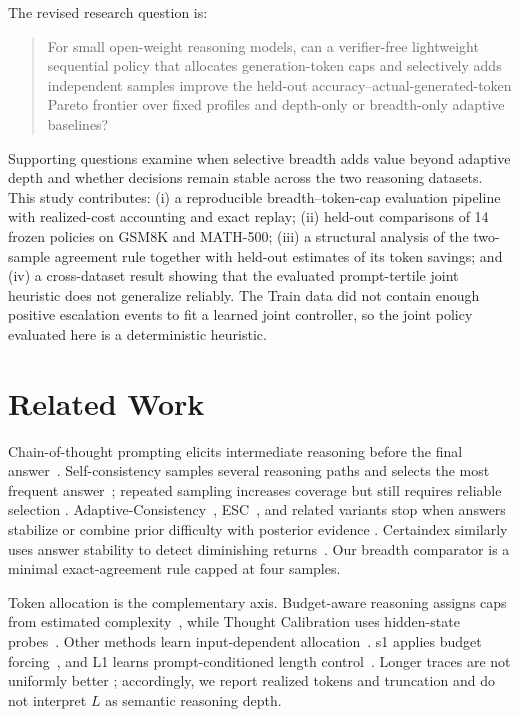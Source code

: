 \documentclass[runningheads]{llncs}
\begin{document}
The revised research question is:

\begin{quote}
For small open-weight reasoning models, can a verifier-free lightweight
sequential policy that allocates generation-token caps and selectively adds
independent samples improve the held-out accuracy--actual-generated-token
Pareto frontier over fixed profiles and depth-only or breadth-only adaptive
baselines?
\end{quote}

Supporting questions examine when selective breadth adds value beyond adaptive
depth and whether decisions remain stable across the two reasoning datasets.
This study contributes: (i) a reproducible
breadth--token-cap evaluation pipeline with realized-cost accounting and exact
replay; (ii) held-out comparisons of 14 frozen policies on GSM8K and
MATH-500; (iii) a structural analysis of the two-sample agreement rule together
with held-out estimates of its token savings; and (iv) a cross-dataset result
showing that the evaluated prompt-tertile joint heuristic does not generalize
reliably. The Train data did not contain enough
positive escalation events to fit a learned joint controller, so the joint
policy evaluated here is a deterministic heuristic.

\section{Related Work}

Chain-of-thought prompting elicits intermediate reasoning before the final
answer~\cite{wei2022cot}. Self-consistency samples several reasoning paths and
selects the most frequent answer~\cite{wang2023selfconsistency}; repeated
sampling increases coverage but still requires reliable selection
\cite{brown2024monkeys}. Adaptive-Consistency~\cite{aggarwal2023adaptive},
ESC~\cite{li2024esc}, and related variants stop when answers stabilize or
combine prior difficulty with posterior evidence
\cite{wang2025penny,wan2025rasc}. Certaindex similarly uses answer stability to
detect diminishing returns~\cite{fu2025certaindex}. Our breadth comparator is a
minimal exact-agreement rule capped at four samples.

Token allocation is the complementary axis. Budget-aware reasoning assigns
caps from estimated complexity~\cite{han2025token}, while Thought Calibration
uses hidden-state probes~\cite{wu2025thought}. Other methods learn
input-dependent allocation~\cite{snell2025scaling,damani2025hard}. s1 applies
budget forcing~\cite{muennighoff2025s1}, and L1 learns prompt-conditioned
length control~\cite{aggarwal2025l1}. Longer traces are not uniformly better
\cite{wu2025moreless}; accordingly, we report realized tokens and truncation
and do not interpret $L$ as semantic reasoning depth.
\end{document}
